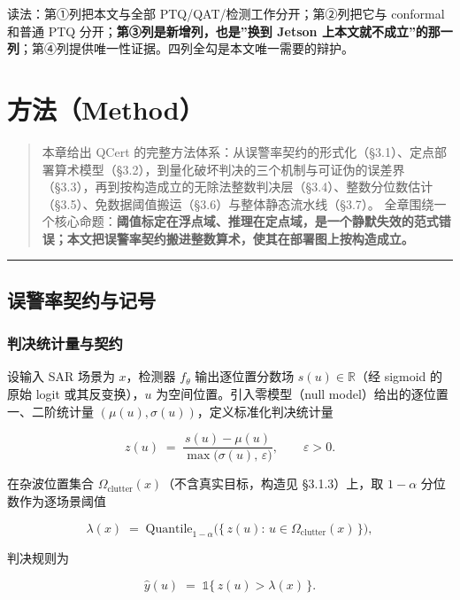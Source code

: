 读法：第①列把本文与全部 PTQ/QAT/检测工作分开；第②列把它与 conformal
和普通 PTQ 分开；\textbf{第③列是新增列，也是''换到 Jetson
上本文就不成立''的那一列}；第④列提供唯一性证据。四列全勾是本文唯一需要的辩护。

\section{方法（Method）}\label{ux65b9ux6cd5method}

\begin{quote}
本章给出 QCert
的完整方法体系：从误警率契约的形式化（§3.1）、定点部署算术模型（§3.2），到量化破坏判决的三个机制与可证伪的误差界（§3.3），再到按构造成立的无除法整数判决层（§3.4）、整数分位数估计（§3.5）、免数据阈值搬运（§3.6）与整体静态流水线（§3.7）。
全章围绕一个核心命题：\textbf{阈值标定在浮点域、推理在定点域，是一个静默失效的范式错误；本文把误警率契约搬进整数算术，使其在部署图上按构造成立。}
\end{quote}

\begin{center}\rule{0.5\linewidth}{0.5pt}\end{center}

\subsection{误警率契约与记号}\label{ux8befux8b66ux7387ux5951ux7ea6ux4e0eux8bb0ux53f7}

\subsubsection{判决统计量与契约}\label{ux5224ux51b3ux7edfux8ba1ux91cfux4e0eux5951ux7ea6}

设输入 SAR 场景为 \(x\)，检测器 \(f_\theta\) 输出逐位置分数场
\(s(u)\in\mathbb{R}\)（经 sigmoid 的原始 logit 或其反变换），\(u\)
为空间位置。引入零模型（null model）给出的逐位置一、二阶统计量
\((\mu(u),\sigma(u))\)，定义标准化判决统计量

\[
z(u) \;=\; \frac{s(u)-\mu(u)}{\max\!\big(\sigma(u),\,\varepsilon\big)},\qquad \varepsilon>0 .
\tag{3.1}
\]

在杂波位置集合 \(\Omega_{\mathrm{clutter}}(x)\)（不含真实目标，构造见
§3.1.3）上，取 \(1-\alpha\) 分位数作为逐场景阈值

\[
\lambda(x) \;=\; \mathrm{Quantile}_{1-\alpha}\Big(\{\,z(u):\,u\in\Omega_{\mathrm{clutter}}(x)\,\}\Big),
\tag{3.2}
\]

判决规则为

\[
\hat{y}(u) \;=\; \mathbb{1}\{\,z(u)>\lambda(x)\,\}.
\tag{3.3}
\]

